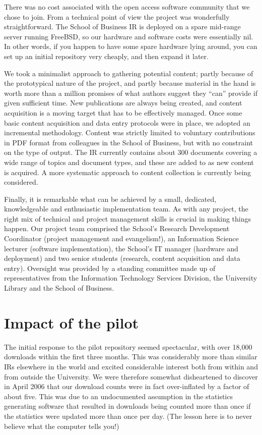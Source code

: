 \documentclass[12pt,pdftex,a4paper,titlepage]{article}
\begin{document}
There was no cost associated with the open access software community that we chose to join. From a technical point of view the project was wonderfully straightforward. The School of Business IR is deployed on a spare mid-range server running FreeBSD, so our hardware and software costs were essentially nil. In other words, if you happen to have some spare hardware lying around, you can set up an initial repository very cheaply, and then expand it later.

We took a minimalist approach to gathering potential content; partly because of the prototypical nature of the project, and partly because material in the hand is worth more than a million promises of what authors suggest they ``can'' provide if given sufficient time. New publications are always being created, and content acquisition is a moving target that has to be effectively managed. Once some basic content acquisition and data entry protocols were in place, we adopted an incremental methodology. Content was strictly limited to voluntary contributions in PDF format from colleagues in the School of Business, but with no constraint on the type of output. The IR currently contains about 300 documents covering a wide range of topics and document types, and these are added to as new content is acquired. A more systematic approach to content collection is currently being considered.

Finally, it is remarkable what can be achieved by a small, dedicated, knowledgeable and enthusiastic implementation team. As with any project, the right mix of technical and project management skills is crucial in making things happen. Our project team comprised the School's Research Development Coordinator (project management and evangelism!), an Information Science lecturer (software implementation), the School's IT manager (hardware and deployment) and two senior students (research, content acquisition and data entry). Oversight was provided by a standing committee made up of representatives from the Information Technology Services Division, the University Library and the School of Business.


\section{Impact of the pilot}

The initial response to the pilot repository seemed spectacular, with over 18,000 downloads within the first three months. This was considerably more than similar IRs elsewhere in the world and excited considerable interest both from within and from outside the University. We were therefore somewhat disheartened to discover in April 2006 that our download counts were in fact over-inflated by a factor of about five. This was due to an undocumented assumption in the statistics generating software that resulted in downloads being counted more than once if the statistics were updated more than once per day. (The lesson here is to never believe what the computer tells you!)
\end{document}
